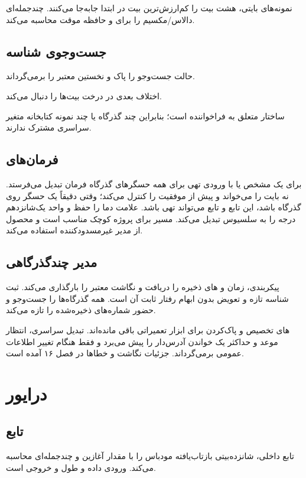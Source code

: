 نمونه‌های بایتی، هشت بیت را کم‌ارزش‌ترین بیت در ابتدا جابه‌جا می‌کنند.  چندجمله‌ای دالاس/مکسیم را برای  و حافظه موقت محاسبه می‌کند.

\subsection{جست‌وجوی شناسه}
 حالت جست‌وجو را پاک و نخستین  معتبر را برمی‌گرداند.

 اختلاف بعدی در درخت بیت‌ها را دنبال می‌کند.

ساختار  متعلق به فراخواننده است؛ بنابراین چند گذرگاه یا چند نمونه کتابخانه متغیر سراسری مشترک ندارند.

\subsection{فرمان‌های }
 برای یک  مشخص یا با ورودی تهی برای همه حسگرهای گذرگاه فرمان تبدیل می‌فرستد.  نه بایت را می‌خواند و پیش از موفقیت  را کنترل می‌کند؛ وقتی دقیقاً یک حسگر روی گذرگاه باشد،  این تابع و تابع  می‌تواند تهی باشد.  علامت دما را حفظ و  واحد یک‌شانزدهم درجه را به سلسیوس تبدیل می‌کند. مسیر  برای پروژه کوچک مناسب است و  محصول از مدیر غیرمسدودکننده استفاده می‌کند.

\subsection{مدیر چندگذرگاهی}
 پیکربندی، زمان و های ذخیره را دریافت و نگاشت معتبر را بارگذاری می‌کند. ثبت شناسه تازه و تعویض بدون ابهام رفتار ثابت آن است.  همه گذرگاه‌ها را جست‌وجو و حضور شماره‌های ذخیره‌شده را تازه می‌کند.

های تخصیص و پاک‌کردن برای ابزار تعمیراتی باقی مانده‌اند.  تبدیل سراسری، انتظار موعد و حداکثر یک خواندن آدرس‌دار را پیش می‌برد و فقط هنگام تغییر اطلاعات عمومی  برمی‌گرداند. جزئیات نگاشت و خطاها در فصل ۱۶ آمده است.

\section{درایور }

\subsection{تابع }
تابع داخلی،
شانزده‌بیتی بازتاب‌یافته مودباس را با مقدار آغازین
و چندجمله‌ای
محاسبه می‌کند. ورودی داده و طول و خروجی
است.

